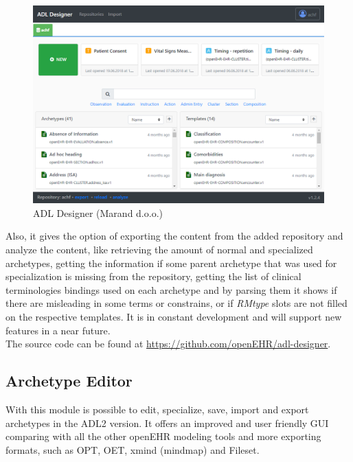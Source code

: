 \documentclass[mim_thesis.tex]{subfiles}
\begin{document}
\begin{figure}[H]
	\centering
    \includegraphics[width=1\textwidth]{img/adldesigner.PNG}
	\caption{ADL Designer (Marand d.o.o.)}
	\label{fig:adldesigner}
\end{figure}

Also, it gives the option of exporting the content from the added repository and analyze the content, like retrieving the amount of normal and specialized archetypes, getting the information if some parent archetype that was used for specialization is missing from the repository, getting the list of clinical terminologies bindings used on each archetype and by parsing them it shows if there are misleading in some terms or constrains, or if \textit{RMtype} slots are not filled on the respective templates. It is in constant development and will support new features in a near future.  \\

The source code can be found at \url{https://github.com/openEHR/adl-designer}. 

\subsection{Archetype Editor}
With this module is possible to edit, specialize, save, import and export archetypes in the ADL2 version. It offers an improved and user friendly GUI comparing with all the other openEHR modeling tools and more exporting formats, such as OPT, OET, xmind (mindmap) and Fileset.
\end{document}

